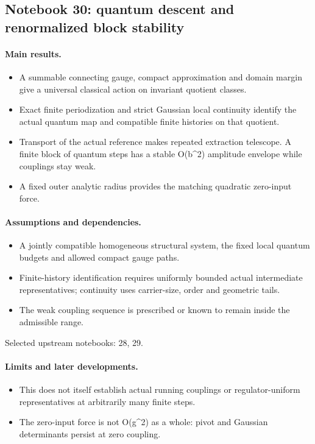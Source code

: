 \documentclass[11pt]{article}
\theoremstyle{remark}
\begin{document}
\subsection{Notebook 30: quantum descent and renormalized block stability}
\label{hnc-30}
\noindent{}\par

\paragraph{Main results.}
\begin{itemize}
\item A summable connecting gauge, compact approximation and domain margin give a universal classical action on invariant quotient classes.
\item Exact finite periodization and strict Gaussian local continuity identify the actual quantum map and compatible finite histories on that quotient.
\item Transport of the actual reference makes repeated extraction telescope. A finite block of quantum steps has a stable O(b\textasciicircum{}2) amplitude envelope while couplings stay weak.
\item A fixed outer analytic radius provides the matching quadratic zero-input force.
\end{itemize}

\paragraph{Assumptions and dependencies.}
\begin{itemize}
\item A jointly compatible homogeneous structural system, the fixed local quantum budgets and allowed compact gauge paths.
\item Finite-history identification requires uniformly bounded actual intermediate representatives; continuity uses carrier-size, order and geometric tails.
\item The weak coupling sequence is prescribed or known to remain inside the admissible range.
\end{itemize}

Selected upstream notebooks: 28, 29.\par

\paragraph{Limits and later developments.}
\begin{itemize}
\item This does not itself establish actual running couplings or regulator-uniform representatives at arbitrarily many finite steps.
\item The zero-input force is not O(g\textasciicircum{}2) as a whole: pivot and Gaussian determinants persist at zero coupling.
\end{itemize}
\end{document}
